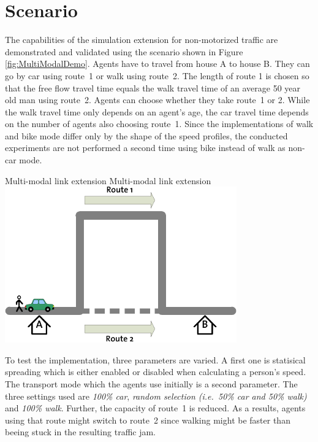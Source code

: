 \section{Scenario}
The capabilities of the simulation extension for non-motorized traffic are demonstrated and validated using the scenario shown in Figure \ref{fig:MultiModalDemo}. Agents have to travel from house A to house B. They can go by car using route~1 or walk using route~2. The length of route 1 is chosen so that the free flow travel time equals the walk travel time of an average 50 year old man using route~2. Agents can choose whether they take route~1 or 2. While the walk travel time only depends on an agent's age, the car travel time depends on the number of agents also choosing route~1. Since the implementations of walk and bike mode differ only by the shape of the speed profiles, the conducted experiments are not performed a second time using bike instead of walk as non-car mode.

\createfigure%
{Multi-modal link extension}%
{Multi-modal link extension}%
{\label{fig:MultiModalDemo}}%
{\includegraphics[width=0.75\textwidth, angle=0]{extending/figures/MultiModalSimulation/MultiModalDemo}}%
{}


To test the implementation, three parameters are varied. A first one is statisical spreading which is either enabled or disabled when calculating a person's speed. The transport mode which the agents use initially is a second parameter. The three settings used are \textit{100\% car}, \textit{random selection (i.e.\ 50\% car and 50\% walk)} and \textit{100\% walk}. Further, the capacity of route~1 is reduced. As a results, agents using that route might switch to route~2 since walking might be faster than beeing stuck in the resulting traffic jam. 

